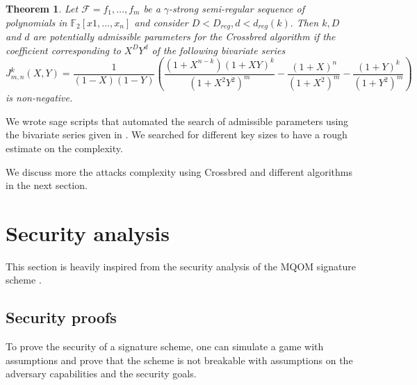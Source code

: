 \documentclass[english]{article}
\newtheorem{theorem}{Theorem}[section]
\begin{document}
		\begin{theorem}\label{serie_J}
			Let $\mathcal{F} = {f_1,\dots,f_m}$ be a $\gamma$-strong semi-regular sequence of polynomials in $\mathbb{F}_2[x1,\dots,x_n]$ and consider $D < D_{reg}, d < d_{reg}(k).$ Then $k, D$ and $d$ are potentially admissible parameters for the Crossbred algorithm if the coefficient corresponding to $X^DY^d$ of the following bivariate series
			$$
			J_{m, n}^k(X, Y) = \frac{1}{(1-X)(1-Y)}\left(\frac{(1+X^{n-k})(1+XY)^k}{(1+X^2Y^2)^m} - \frac{(1+X)^n}{(1+X^2)^m} - \frac{(1+Y)^k}{(1+Y^2)^m}\right)
			$$
			is non-negative.
		\end{theorem}
		
		We wrote sage scripts that automated the search of admissible parameters using the bivariate series given in \cite{VID24}. We searched for different key sizes to have a rough estimate on the complexity.
		
		We discuss more the attacks complexity using Crossbred and different algorithms in the next section.
		
	\section{Security analysis}
		This section is heavily inspired from the security analysis of the MQOM signature scheme \cite{MQOMv2}.
		
		\subsection{Security proofs}
		To prove the security of a signature scheme, one can simulate a game with assumptions and prove that the scheme is not breakable with assumptions on the adversary capabilities and the security goals.
		
\end{document}
